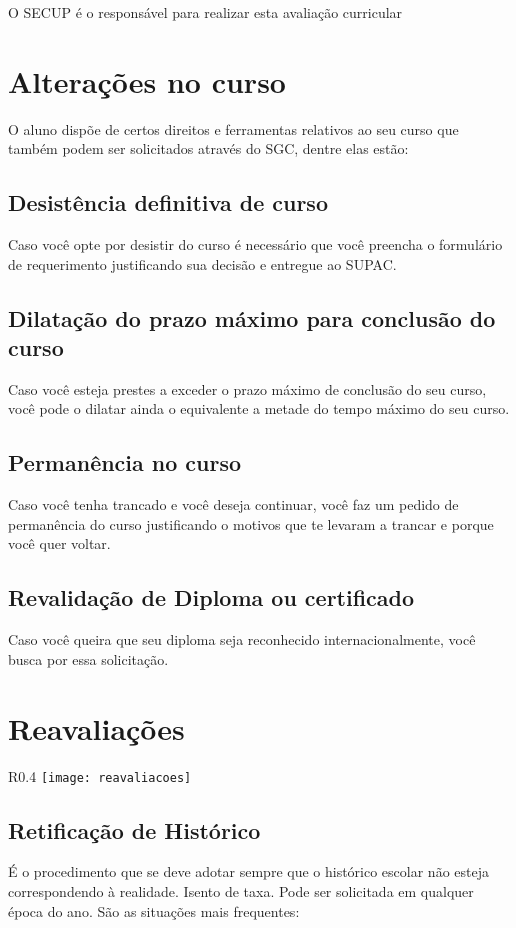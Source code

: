 O SECUP é o responsável para realizar esta avaliação curricular

\section{Alterações no curso}

O aluno dispõe de certos direitos e ferramentas relativos ao seu curso que também podem ser solicitados através do SGC, dentre elas estão:
                    
\subsection{Desistência definitiva de curso} 
Caso você opte por desistir do curso é necessário que você preencha o formulário de requerimento justificando sua decisão e entregue ao SUPAC.
                    
\subsection{Dilatação do prazo máximo para conclusão do curso} 
Caso você esteja prestes a exceder o prazo máximo de conclusão do seu curso, você pode o dilatar ainda o equivalente a metade do tempo máximo do seu curso.
                     
\subsection{Permanência no curso} 
Caso você tenha trancado e você deseja continuar, você faz um pedido de permanência do curso justificando o motivos que te levaram a trancar e porque você quer voltar.

\subsection{Revalidação de Diploma ou certificado} 
Caso você queira que seu diploma seja reconhecido internacionalmente, você busca por essa solicitação.

\section{Reavaliações}
\begin{wrapfigure}{R}{0.4\textwidth}
    \centering
    \texttt{[image: reavaliacoes]}
\end{wrapfigure}

\subsection{Retificação de Histórico}
É o procedimento que se deve adotar sempre que o histórico escolar não esteja correspondendo à realidade. Isento de taxa. Pode ser solicitada em qualquer época do ano. São as situações mais frequentes:

